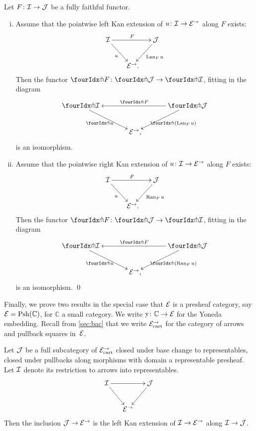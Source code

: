 \documentclass[reqno,10pt,a4paper,oneside,draft]{amsart}
\begin{document}
{{\begin{proposition} \label{kan-extension-closure}
Let $F \co \cal{I} \to \cal{J}$ be a fully faithful functor.
\begin{enumerate}[(i)]
\item Assume that the pointwise left Kan extension of $u \co \cal{I} \to \catE^\to$ along $F$ exists:
\[
\xymatrix@!C@C-1em{
  \cal{I}
  \ar[dr]_{u}
  \ar[rr]^{F}
&&
  \cal{J}
  \ar[dl]^{\Lan_F u}
\\&
  \catE^\to
\rlap{.}}
\]
Then the functor $\liftr{F} \co \liftr{\cal{J}} \to \liftr{\cal{I}}$, fitting in the diagram
\[
\xymatrix@!C@C-1em{
  \liftr{\cal{I}}
  \ar[dr]_{\liftr{u}}
&&
  \liftr{\cal{J}}
  \ar[ll]_{\liftr{F}}
  \ar[dl]^{\liftr{(\Lan_F u)}}
\\&
  \catE^\to
\rlap{,}}
\]
is an isomorphism.
\item Assume that the pointwise right Kan extension of $u \co \cal{I} \to \catE^\to$ along $F$ exists:
\[
\xymatrix@!C@C-1em{
  \cal{I}
  \ar[dr]_{u}
  \ar[rr]^{F}
&&
  \cal{J}
  \ar[dl]^{\Ran_F u}
\\&
  \catE^\to
\rlap{.}}
\]
Then the functor $\liftl{F} \co \liftl{\cal{J}} \to \liftl{\cal{I}}$, fitting in the diagram
\[
\xymatrix@!C@C-1em{
  \liftl{\cal{I}}
  \ar[dr]_{\liftl{u}}
&&
  \liftl{\cal{J}}
  \ar[ll]_{\liftl{F}}
  \ar[dl]^{\liftl{(\Ran_F u)}}
\\&
  \catE^\to
\rlap{,}}
\]
is an isomorphism.
\qed
\end{enumerate}
\end{proposition}

Finally, we prove two results in the special case that $\catE$ is a presheaf category, say $\cal{E} = \Psh(\mathbb{C})$, for $\mathbb{C}$ a small category.
We write $\yon \co \mathbb{C} \to \cal{E}$ for the Yoneda embedding.
Recall from \cref{sec:bac} that we write $\catE_{\cart}^\to$ for the category of arrows and pullback squares in~$\cal{E}$.

\begin{lemma} \label{left-kan-extension-of-representables}
Let $\cal{J}$ be a full subcategory of $\catE_{\cart}^\to$ closed under base change to representables, \ie closed under pullbacks along morphisms with domain a representable presheaf.
Let $\cal{I}$ denote its restriction to arrows into representables.
\[
\xymatrix@C-1em{
  \cal{I}
  \ar[rr]
  \ar[dr]
&&
  \cal{J}
  \ar[dl]
\\&
  \catE^\to
}
\]
Then the inclusion $\cal{J} \to \catE^\to$ is the left Kan extension of $\cal{I} \to \catE^\to$ along $\cal{I} \to \cal{J}$.
\end{lemma}

}}
\end{document}

